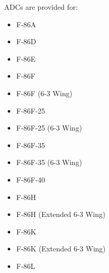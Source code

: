 ADCs are provided for:
\begin{itemize}
    \item F-86A
    \item F-86D
    \item F-86E
    \item F-86F
    \item F-86F (6-3 Wing)
    \item F-86F-25
    \item F-86F-25 (6-3 Wing)
    \item F-86F-35
    \item F-86F-35 (6-3 Wing)
    \item F-86F-40
    \item F-86H
    \item F-86H (Extended 6-3 Wing)
    \item F-86K
    \item F-86K (Extended 6-3 Wing)
    \item F-86L
\end{itemize}